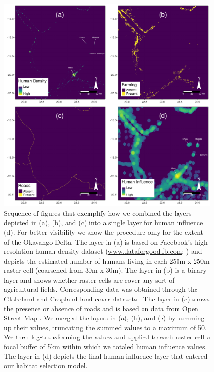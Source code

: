 \documentclass[abstract=off,10pt,a4paper,bibliography=totocnumbered]{article}
\begin{document}
\begin{figure}[hbtp]
  \begin{center}
    \includegraphics[width = \textwidth]{99_HumanInfluence.pdf}
    \caption{Sequence of figures that exemplify how we combined the layers
    depicted in (a), (b), and (c) into a single layer for human influence (d).
    For better visibility we show the procedure only for the extent of the
    Okavango Delta. The layer in (a) is based on Facebook's high resolution
    human density dataset (\url{www.dataforgood.fb.com};
    \citealp{Facebook.2019}) and depicts the estimated number of humans living
    in each 250m x 250m raster-cell (coarsened from 30m x 30m). The layer in (b)
    is a binary layer and shows whether raster-cells are cover any sort of
    agricultural fields. Corresponding data was obtained through the Globeland
    and Cropland land cover datasets \citep{Chen.2015, Xiong.2017}. The layer in
    (c) shows the presence or absence of roads and is based on data from Open
    Street Map \citep{OpenStreetMap.2019}. We merged the layers in (a), (b), and
    (c) by summing up their values, truncating the summed values to a maximum of
    50. We then log-transforming the values and applied to each raster cell a
    focal buffer of 5km within which we totaled human influence values. The
    layer in (d) depicts the final human influence layer that entered our
    habitat selection model.}
    \label{HumanInfluence}
  \end{center}
\end{figure}
\end{document}
